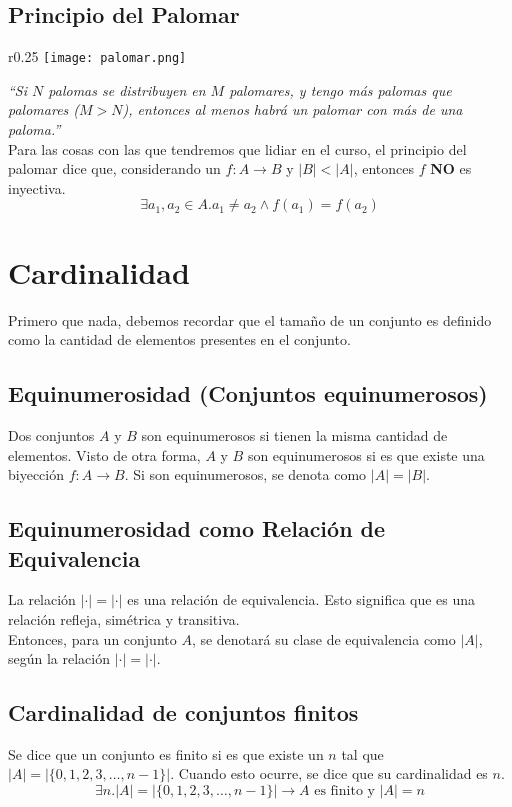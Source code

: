 \documentclass[../main.tex]{subfiles}
\begin{document}
\subsection{Principio del Palomar}
\begin{wrapfigure}{r}{0.25\textwidth}
    \centering
    \texttt{[image: palomar.png]}
\end{wrapfigure}
\textit{``Si $N$ palomas se distribuyen en $M$ palomares, y tengo más palomas que palomares ($M > N$), entonces al menos habrá un palomar con más de una paloma.''}\\
Para las cosas con las que tendremos que lidiar en el curso, el principio del palomar dice que, considerando un $f: A \rightarrow B$ y $|B| < |A|$, entonces $f$ \textbf{NO} es inyectiva.
\[ \exists a_1, a_2 \in A . a_1 \not= a_2 \wedge f(a_1) = f(a_2) \]

\section{Cardinalidad}
Primero que nada, debemos recordar que el tamaño de un conjunto es definido como la cantidad de elementos presentes en el conjunto.

\subsection{Equinumerosidad (Conjuntos equinumerosos)}
Dos conjuntos $A$ y $B$ son equinumerosos si tienen la misma cantidad de elementos. Visto de otra forma, $A$ y $B$ son equinumerosos si es que existe una biyección $f: A \rightarrow B$. Si son equinumerosos, se denota como $|A| = |B|$.

\subsection{Equinumerosidad como Relación de Equivalencia}
La relación $|\cdot| = |\cdot|$ es una relación de equivalencia. Esto significa que es una relación refleja, simétrica y transitiva.\\
Entonces, para un conjunto $A$, se denotará su clase de equivalencia como $|A|$, según la relación $|\cdot| = |\cdot|$.

\subsection{Cardinalidad de conjuntos finitos}
Se dice que un conjunto es finito si es que existe un $n$ tal que $|A| = |\{ 0,1,2,3,\ldots,n-1 \}|$. Cuando esto ocurre, se dice que su cardinalidad es $n$.
\[ \exists n . |A| = |\{ 0,1,2,3,\ldots,n-1 \}| \rightarrow A \text{ es finito y } |A| = n \]
\end{document}
